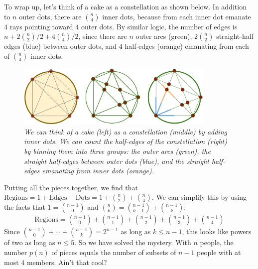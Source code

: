 \documentclass{article}
\begin{document}
            To wrap up, let's think of a cake as a constellation as shown
            below.  In addition to $n$ outer dots, there are ${n \choose 4}$
            inner dots, because from each inner dot emanate $4$ rays pointing
            toward $4$ outer dots.  By similar logic, the number of edges is $n
            + 2{n\choose 2}/2 + 4{n \choose 4}/2$, since there are $n$ outer
            arcs (green), $2{n\choose 2}$ straight-half edges (blue) between
            outer dots, and $4$ half-edges (orange) emanating from each of
            ${n\choose 4}$ inner dots.
            \begin{figure}[h!]
                \centering
                \includegraphics[height=3cm]{count}
                \caption{\emph{
                    We can think of a cake (left)
                    as a constellation (middle) by adding inner dots.
                    We can count the half-edges of the constellation (right) 
                    by binning them into three groups: the outer arcs (green),
                    the straight half-edges between outer dots (blue), and the
                    straight half-edges emanating from inner dots (orange).
                }}
            \end{figure}

            Putting all the pieces together, we find that
            $
                \text{Regions} = 1 + \text{Edges} - \text{Dots}
                               = 1 + {n\choose 2} + {n\choose 4}
            $.  We can simplify this by using the facts that $1={n-1 \choose
            0}$ and ${n \choose k} = {n-1 \choose k-1} + {n-1 \choose k}$:
            \begin{align*}
                \text{Regions}
                              = {n-1 \choose 0}
                              + {n-1 \choose 1}
                              + {n-1 \choose 2}
                              + {n-1 \choose 3}
                              + {n-1 \choose 4}
            \end{align*}
            Since ${n-1\choose 0} + \cdots + {n-1\choose k} = 2^{n-1}$ as long
            as $k\leq n-1$, this looks like powers of two as long as $n\leq 5$.  
            So we have solved the mystery.  With $n$ people, the number $p(n)$
            of pieces equals the number of subsets of $n-1$ people with at most
            $4$ members.  Ain't that cool?  
 
\end{document}
